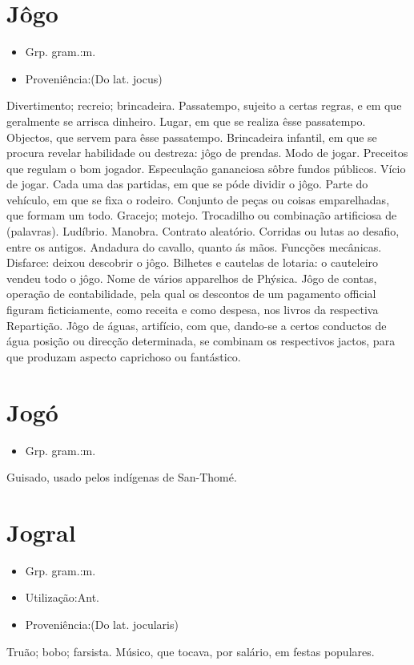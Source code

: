 \documentclass{article}
\begin{document}
\section{Jôgo}
\begin{itemize}
\item {Grp. gram.:m.}
\end{itemize}
\begin{itemize}
\item {Proveniência:(Do lat. \textunderscore jocus\textunderscore )}
\end{itemize}
Divertimento; recreio; brincadeira.
Passatempo, sujeito a certas regras, e em que geralmente se arrisca dinheiro.
Lugar, em que se realiza êsse passatempo.
Objectos, que servem para êsse passatempo.
Brincadeira infantil, em que se procura revelar habilidade ou destreza: \textunderscore jôgo de prendas\textunderscore .
Modo de jogar.
Preceitos que regulam o bom jogador.
Especulação gananciosa sôbre fundos públicos.
Vício de jogar.
Cada uma das partidas, em que se póde dividir o jôgo.
Parte do vehículo, em que se fixa o rodeiro.
Conjunto de peças ou coisas emparelhadas, que formam um todo.
Gracejo; motejo.
Trocadilho ou combinação artificiosa de (palavras).
Ludíbrio.
Manobra.
Contrato aleatório.
Corridas ou lutas ao desafio, entre os antigos.
Andadura do cavallo, quanto ás mãos.
Funcções mecânicas.
Disfarce: \textunderscore deixou descobrir o jôgo\textunderscore .
Bilhetes e cautelas de lotaria: \textunderscore o cauteleiro vendeu todo o jôgo\textunderscore .
Nome de vários apparelhos de Phýsica.
\textunderscore Jôgo de contas\textunderscore , operação de contabilidade, pela qual os descontos de um pagamento official figuram ficticiamente, como receita e como despesa, nos livros da respectiva Repartição.
\textunderscore Jôgo de águas\textunderscore , artifício, com que, dando-se a certos conductos de água posição ou direcção determinada, se combinam os respectivos jactos, para que produzam aspecto caprichoso ou fantástico.
\section{Jogó}
\begin{itemize}
\item {Grp. gram.:m.}
\end{itemize}
Guisado, usado pelos indígenas de San-Thomé.
\section{Jogral}
\begin{itemize}
\item {Grp. gram.:m.}
\end{itemize}
\begin{itemize}
\item {Utilização:Ant.}
\end{itemize}
\begin{itemize}
\item {Proveniência:(Do lat. \textunderscore jocularis\textunderscore )}
\end{itemize}
Truão; bobo; farsista.
Músico, que tocava, por salário, em festas populares.
\end{document}
